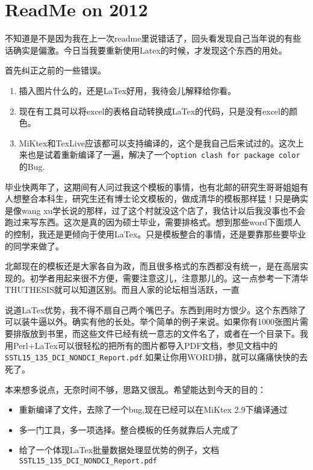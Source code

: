 \documentclass[a4paper,oneside,xetex]{ctexbook}
\begin{document}
\chapter{ReadMe on 2012}
不知道是不是因为我在上一次readme里说错话了，回头看发现自己当年说的有些话确实是偏激。今日当我要重新使用Latex的时候，才发现这个东西的用处。

首先纠正之前的一些错误。
\begin{enumerate}
\item 插入图片什么的，还是LaTex好用，我待会儿解释给你看。
\item 现在有工具可以将excel的表格自动转换成LaTex的代码，只是没有excel的颜色。
\item MiKtex和TexLive应该都可以支持编译的，这个是我自己后来试过的。这次上来也是试着重新编译了一遍，解决了一个\verb*|option clash for package color|的Bug.
\end{enumerate}

毕业快两年了，这期间有人问过我这个模板的事情，也有北邮的研究生哥哥姐姐有人想整合本科生，研究生还有博士论文模板的，做成清华的模板那样猛！只是确实是像wang xu学长说的那样，过了这个村就没这个店了，我估计以后我没事也不会跑过来写东西。这次是真的因为硕士毕业，需要排格式。想到那些word下面烦人的控制，我还是更倾向于使用LaTex。只是模板整合的事情，还是要靠那些要毕业的同学来做了。

北邮现在的模板还是大家各自为政，而且很多格式的东西都没有统一，是在高层实现的。初学者用起来很不方便，需要注意这儿，注意那儿的。这一点参考一下清华THUTHESIS就可以知道区别。而且人家的论坛相当活跃，一直

说道LaTex优势，我不得不扇自己两个嘴巴子。东西到用时方恨少。这个东西除了可以装牛逼以外。确实有他的长处。举个简单的例子来说。如果你有1000张图片需要排版放到书里，而这些文件已经有统一意志的文件名了，或者在一个目录下。我用Perl+LaTex可以很轻松的把所有的图片都导入PDF文档，参见文档中的\verb*|SSTL15_135_DCI_NONDCI_Report.pdf|.如果让你用WORD排，就可以痛痛快快的去死了。

本来想多说点，无奈时间不够，思路又很乱。希望能达到今天的目的：
\begin{itemize}
\item 重新编译了文件，去除了一个bug,现在已经可以在MiKtex 2.9下编译通过
\item 多一门工具，多一项选择。整合模板的任务就靠后人完成了
\item 给了一个体现LaTex批量数据处理显优势的例子，文档\verb*|SSTL15_135_DCI_NONDCI_Report.pdf|
\end{itemize}
\end{document}
